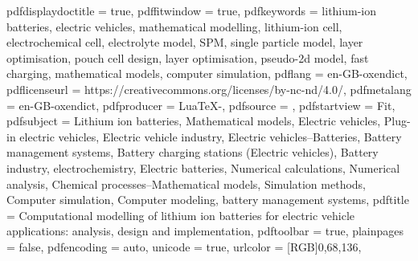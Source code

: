 {    pdfdisplaydoctitle = true,
    pdffitwindow       = true,
    pdfkeywords        = {lithium-ion batteries, electric vehicles, mathematical modelling, lithium-ion cell, electrochemical cell, electrolyte model, SPM, single particle model, layer optimisation, pouch cell design, layer optimisation, pseudo-2d model, fast charging, mathematical models, computer simulation},
    pdflang            = {en-GB-oxendict},
    pdflicenseurl      = {https://creativecommons.org/licenses/by-nc-nd/4.0/},
    pdfmetalang        = {en-GB-oxendict},
    pdfproducer        = {LuaTeX-\luatexversionused},
    pdfsource          = {},
    pdfstartview       = {Fit},
    pdfsubject         = {Lithium ion batteries, Mathematical models, Electric vehicles, Plug-in electric vehicles, Electric vehicle industry, Electric vehicles--Batteries, Battery management systems, Battery charging stations (Electric vehicles), Battery industry, electrochemistry, Electric batteries, Numerical calculations, Numerical analysis, Chemical processes--Mathematical models, Simulation methods, Computer simulation, Computer modeling, battery management systems},
    pdftitle           = {Computational modelling of lithium ion batteries for electric vehicle applications: analysis, design and implementation},
    pdftoolbar         = true,
    plainpages         = false,
    pdfencoding        = auto,
    unicode            = true,
    urlcolor           = [RGB]{0,68,136}, %
}%



\usepackage{nameref}
\usepackage{algorithm} %
\usepackage{hypcap} %

\usepackage{pdftexcmds} %

\usepackage{glossaries-extra} %

\usepackage{hypdestopt} %

\usepackage{bookmark} %
\usepackage{cleveref}

